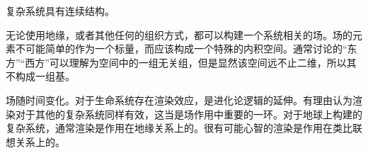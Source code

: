 \documentclass{ctexart}
\begin{document}
复杂系统具有连续结构。

无论使用地缘，或者其他任何的组织方式，都可以构建一个系统相关的场。场的元素不可能简单的作为一个标量，而应该构成一个特殊的内积空间。通常讨论的“东方”“西方”可以理解为空间中的一组无关组，但是显然该空间远不止二维，所以其不构成一组基。

场随时间变化。对于生命系统存在渲染效应，是进化论逻辑的延伸。有理由认为渲染对于其他的复杂系统同样有效，这当是场作用中重要的一环。对于地球上构建的复杂系统，通常渲染是作用在地缘关系上的。很有可能心智的渲染是作用在类比联想关系上的。
\end{document}

